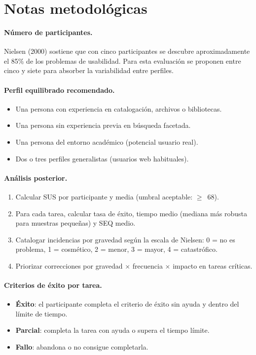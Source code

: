 \section{Notas metodológicas}

\paragraph{Número de participantes.}
Nielsen (2000) sostiene que con cinco participantes se descubre aproximadamente el 85\% de
los problemas de usabilidad. Para esta evaluación se proponen entre cinco y siete para
absorber la variabilidad entre perfiles.

\paragraph{Perfil equilibrado recomendado.}
\begin{itemize}
\item Una persona con experiencia en catalogación, archivos o bibliotecas.
\item Una persona sin experiencia previa en búsqueda facetada.
\item Una persona del entorno académico (potencial usuario real).
\item Dos o tres perfiles generalistas (usuarios web habituales).
\end{itemize}

\paragraph{Análisis posterior.}
\begin{enumerate}
\item Calcular SUS por participante y media (umbral aceptable: $\geq$~68).
\item Para cada tarea, calcular tasa de éxito, tiempo medio (mediana más robusta para
  muestras pequeñas) y SEQ medio.
\item Catalogar incidencias por gravedad según la escala de Nielsen: 0 = no es problema,
  1 = cosmético, 2 = menor, 3 = mayor, 4 = catastrófico.
\item Priorizar correcciones por gravedad $\times$ frecuencia $\times$ impacto en tareas
  críticas.
\end{enumerate}

\paragraph{Criterios de éxito por tarea.}
\begin{itemize}
\item \textbf{Éxito}: el participante completa el criterio de éxito sin ayuda y dentro del
  límite de tiempo.
\item \textbf{Parcial}: completa la tarea con ayuda o supera el tiempo límite.
\item \textbf{Fallo}: abandona o no consigue completarla.
\end{itemize}

